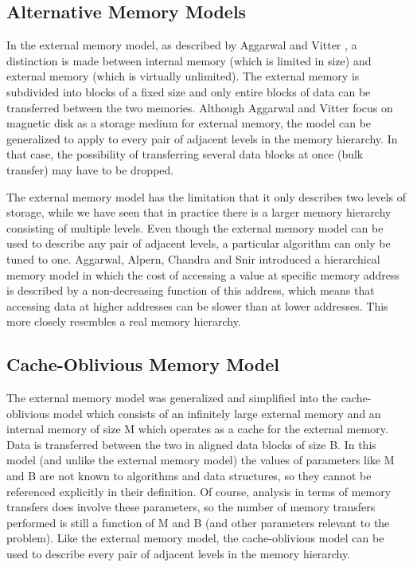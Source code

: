 \documentclass{acm_proc_article-sp}
\begin{document}
\subsection{Alternative Memory Models}
In the external memory model, as described by Aggarwal and Vitter \cite{aggarwal1988ioc}, a distinction is made between internal memory (which is limited in size) and external memory (which is virtually unlimited). The external memory is subdivided into blocks of a fixed size and only entire blocks of data can be transferred between the two memories. Although Aggarwal and Vitter focus on magnetic disk as a storage medium for external memory, the model can be generalized to apply to every pair of adjacent levels in the memory hierarchy. In that case, the possibility of transferring several data blocks at once (bulk transfer) may have to be dropped.

The external memory model has the limitation that it only describes two levels of storage, while we have seen that in practice there is a larger memory hierarchy consisting of multiple levels. Even though the external memory model can be used to describe any pair of adjacent levels, a particular algorithm can only be tuned to one. Aggarwal, Alpern, Chandra and Snir \cite{aggarwal1987mhm} introduced a hierarchical memory model in which the cost of accessing a value at specific memory address is described by a non-decreasing function of this address, which means that accessing data at higher addresses can be slower than at lower addresses. This more closely resembles a real memory hierarchy.

\subsection{Cache-Oblivious Memory Model}
The external memory model was generalized and simplified into the cache-oblivious model \cite{prokop1999coa} which consists of an infinitely large external memory and an internal memory of size M which operates as a cache for the external memory. Data is transferred between the two in aligned data blocks of size B. In this model (and unlike the external memory model) the values of parameters like M and B are not known to algorithms and data structures, so they cannot be referenced explicitly in their definition. Of course, analysis in terms of memory transfers does involve these parameters, so the number of memory transfers performed is still a function of M and B (and other parameters relevant to the problem). Like the external memory model, the cache-oblivious model can be used to describe every pair of adjacent levels in the memory hierarchy.
\end{document}

